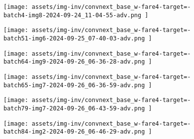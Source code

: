 \begin{figure*}[t]
    \vspace{1mm}
    \begin{minipage}[t]{.025\textwidth}
         \vspace{9mm}
    \end{minipage}%
    \begin{minipage}[t]{.98\textwidth}
        \vspace{0pt}
            \begin{subfigure}[t]{0.16\textwidth}
                    \texttt{[image:  assets/img-inv/convnext\_base\_w-fare4-target=-batch4-img8-2024-09-24\_11-04-55-adv.png ]}
            \end{subfigure}%
                \hspace{0.5mm}%
            \begin{subfigure}[t]{0.16\textwidth}
                    \texttt{[image:  assets/img-inv/convnext\_base\_w-fare4-target=-batch51-img6-2024-09-25\_07-40-03-adv.png ]}
            \end{subfigure}%
                \hspace{0.5mm}%
            \begin{subfigure}[t]{0.16\textwidth}
                    \texttt{[image:  assets/img-inv/convnext\_base\_w-fare4-target=-batch64-img9-2024-09-26\_06-36-28-adv.png ]}
            \end{subfigure}%
                \hspace{0.5mm}%
            \begin{subfigure}[t]{0.16\textwidth}
                    \texttt{[image:  assets/img-inv/convnext\_base\_w-fare4-target=-batch65-img7-2024-09-26\_06-36-59-adv.png ]}
            \end{subfigure}%
                \hspace{0.5mm}%
            \begin{subfigure}[t]{0.16\textwidth}
                    \texttt{[image:  assets/img-inv/convnext\_base\_w-fare4-target=-batch79-img7-2024-09-26\_06-43-59-adv.png ]}
            \end{subfigure}%
                \hspace{0.5mm}%
            \begin{subfigure}[t]{0.16\textwidth}
                    \texttt{[image:  assets/img-inv/convnext\_base\_w-fare4-target=-batch84-img2-2024-09-26\_06-46-29-adv.png ]}
            \end{subfigure}%
    \end{minipage}


\end{figure*}
